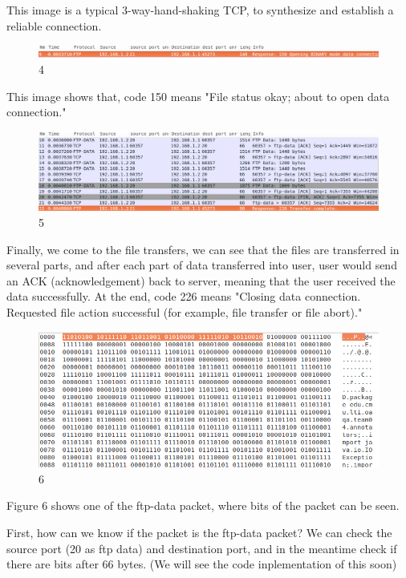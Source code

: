 \documentclass[a4paper,12pt]{article}
\begin{document}
This image is a typical 3-way-hand-shaking TCP, to synthesize and establish a reliable connection.

\begin{figure}[ht!]
\centering
\includegraphics[width=120mm]{3.png}
\caption{4 \label{overflow}}
\end{figure}

This image shows that, code 150 means "File status okay; about to open data connection."

\begin{figure}[ht!]
\centering
\includegraphics[width=120mm]{4.png}
\caption{5 \label{overflow}}
\end{figure}

Finally, we come to the file transfers, we can see that the files are transferred in several parts, and after each part of data transferred into user, user would send an ACK (acknowledgement) back to server, meaning that the user received the data successfully. At the end, code 226 means "Closing data connection. Requested file action successful (for example, file transfer or file abort)."

\begin{figure}[ht!]
\centering
\includegraphics[width=120mm]{5.png}
\caption{6 \label{overflow}}
\end{figure}

Figure 6 shows one of the ftp-data packet, where bits of the packet can be seen.

First, how can we know if the packet is the ftp-data packet? We can check the source port (20 as ftp data) and destination port, and in the meantime check if there are bits after 66 bytes. (We will see the code inplementation of this soon)
\end{document}
